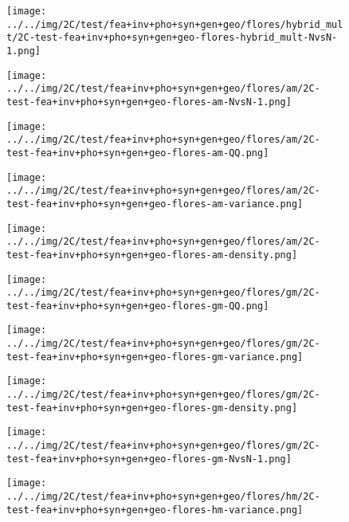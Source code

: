 \begin{figure}[H]
\centering	\texttt{[image: ../../img/2C/test/fea+inv+pho+syn+gen+geo/flores/hybrid\_mult/2C-test-fea+inv+pho+syn+gen+geo-flores-hybrid\_mult-NvsN-1.png]}
\end{figure}
\begin{figure}[H]
\centering	\texttt{[image: ../../img/2C/test/fea+inv+pho+syn+gen+geo/flores/am/2C-test-fea+inv+pho+syn+gen+geo-flores-am-NvsN-1.png]}
\end{figure}
\begin{figure}[H]
\centering	\texttt{[image: ../../img/2C/test/fea+inv+pho+syn+gen+geo/flores/am/2C-test-fea+inv+pho+syn+gen+geo-flores-am-QQ.png]}
\end{figure}
\begin{figure}[H]
\centering	\texttt{[image: ../../img/2C/test/fea+inv+pho+syn+gen+geo/flores/am/2C-test-fea+inv+pho+syn+gen+geo-flores-am-variance.png]}
\end{figure}
\begin{figure}[H]
\centering	\texttt{[image: ../../img/2C/test/fea+inv+pho+syn+gen+geo/flores/am/2C-test-fea+inv+pho+syn+gen+geo-flores-am-density.png]}
\end{figure}
\begin{figure}[H]
\centering	\texttt{[image: ../../img/2C/test/fea+inv+pho+syn+gen+geo/flores/gm/2C-test-fea+inv+pho+syn+gen+geo-flores-gm-QQ.png]}
\end{figure}
\begin{figure}[H]
\centering	\texttt{[image: ../../img/2C/test/fea+inv+pho+syn+gen+geo/flores/gm/2C-test-fea+inv+pho+syn+gen+geo-flores-gm-variance.png]}
\end{figure}
\begin{figure}[H]
\centering	\texttt{[image: ../../img/2C/test/fea+inv+pho+syn+gen+geo/flores/gm/2C-test-fea+inv+pho+syn+gen+geo-flores-gm-density.png]}
\end{figure}
\begin{figure}[H]
\centering	\texttt{[image: ../../img/2C/test/fea+inv+pho+syn+gen+geo/flores/gm/2C-test-fea+inv+pho+syn+gen+geo-flores-gm-NvsN-1.png]}
\end{figure}
\begin{figure}[H]
\centering	\texttt{[image: ../../img/2C/test/fea+inv+pho+syn+gen+geo/flores/hm/2C-test-fea+inv+pho+syn+gen+geo-flores-hm-variance.png]}
\end{figure}
